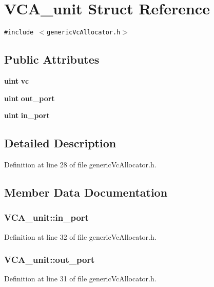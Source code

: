 \section{VCA\_\-unit Struct Reference}
\label{structVCA__unit}
{\tt \#include $<$genericVcAllocator.h$>$}

\subsection*{Public Attributes}
\begin{CompactItemize}
\item 
{\bf uint} {\bf vc}
\item 
{\bf uint} {\bf out\_\-port}
\item 
{\bf uint} {\bf in\_\-port}
\end{CompactItemize}


\subsection{Detailed Description}


Definition at line 28 of file genericVcAllocator.h.

\subsection{Member Data Documentation}
\subsubsection[{in\_\-port}]{ {\bf VCA\_\-unit::in\_\-port}}\label{structVCA__unit_01406d1bc6c7c438649c3e474b871f82}




Definition at line 32 of file genericVcAllocator.h.
\subsubsection[{out\_\-port}]{ {\bf VCA\_\-unit::out\_\-port}}\label{structVCA__unit_c484dbc4818043ee7d415731a866a44c}




Definition at line 31 of file genericVcAllocator.h.
